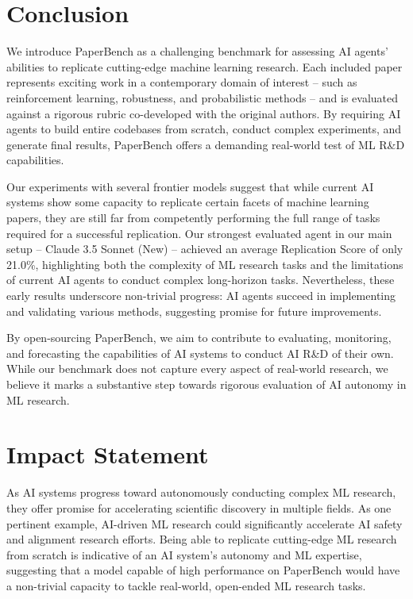 \documentclass{article}
\theoremstyle{plain}
\theoremstyle{definition}
\theoremstyle{remark}
\begin{document}
\section{Conclusion}

We introduce PaperBench as a challenging benchmark for assessing AI agents’ abilities to replicate cutting-edge machine learning research. Each included paper represents exciting work in a contemporary domain of interest -- such as reinforcement learning, robustness, and probabilistic methods -- and is evaluated against a rigorous rubric co-developed with the original authors. By requiring AI agents to build entire codebases from scratch, conduct complex experiments, and generate final results, PaperBench offers a demanding real-world test of ML R\&D capabilities.

Our experiments with several frontier models suggest that while current AI systems show some capacity to replicate certain facets of machine learning papers, they are still far from competently performing the full range of tasks required for a successful replication. Our strongest evaluated agent in our main setup -- Claude 3.5 Sonnet (New) -- achieved an average Replication Score of only 21.0\%, highlighting both the complexity of ML research tasks and the limitations of current AI agents to conduct complex long-horizon tasks. Nevertheless, these early results underscore non-trivial progress: AI agents succeed in implementing and validating various methods, suggesting promise for future improvements.

By open-sourcing PaperBench, we aim to contribute to evaluating, monitoring, and forecasting the capabilities of AI systems to conduct AI R\&D of their own. While our benchmark does not capture every aspect of real-world research, we believe it marks a substantive step towards rigorous evaluation of AI autonomy in ML research.

\section*{Impact Statement}

As AI systems progress toward autonomously conducting complex ML research, they offer promise for accelerating scientific discovery in multiple fields. As one pertinent example, AI-driven ML research could significantly accelerate AI safety and alignment research efforts. Being able to replicate cutting-edge ML research from scratch is indicative of an AI system’s autonomy and ML expertise, suggesting that a model capable of high performance on PaperBench would have a non-trivial capacity to tackle real-world, open-ended ML research tasks.
\end{document}
